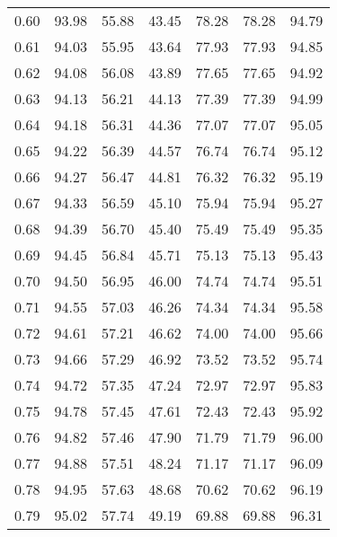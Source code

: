 \begin{tabular}{|c|c|c|c|c|c|c|}
      0.60 &     93.98 &     55.88 &      43.45 &   78.28 &      78.28 &         94.79 \\
      0.61 &     94.03 &     55.95 &      43.64 &   77.93 &      77.93 &         94.85 \\
      0.62 &     94.08 &     56.08 &      43.89 &   77.65 &      77.65 &         94.92 \\
      0.63 &     94.13 &     56.21 &      44.13 &   77.39 &      77.39 &         94.99 \\
      0.64 &     94.18 &     56.31 &      44.36 &   77.07 &      77.07 &         95.05 \\
      0.65 &     94.22 &     56.39 &      44.57 &   76.74 &      76.74 &         95.12 \\
      0.66 &     94.27 &     56.47 &      44.81 &   76.32 &      76.32 &         95.19 \\
      0.67 &     94.33 &     56.59 &      45.10 &   75.94 &      75.94 &         95.27 \\
      0.68 &     94.39 &     56.70 &      45.40 &   75.49 &      75.49 &         95.35 \\
      0.69 &     94.45 &     56.84 &      45.71 &   75.13 &      75.13 &         95.43 \\
      0.70 &     94.50 &     56.95 &      46.00 &   74.74 &      74.74 &         95.51 \\
      0.71 &     94.55 &     57.03 &      46.26 &   74.34 &      74.34 &         95.58 \\
      0.72 &     94.61 &     57.21 &      46.62 &   74.00 &      74.00 &         95.66 \\
      0.73 &     94.66 &     57.29 &      46.92 &   73.52 &      73.52 &         95.74 \\
      0.74 &     94.72 &     57.35 &      47.24 &   72.97 &      72.97 &         95.83 \\
      0.75 &     94.78 &     57.45 &      47.61 &   72.43 &      72.43 &         95.92 \\
      0.76 &     94.82 &     57.46 &      47.90 &   71.79 &      71.79 &         96.00 \\
      0.77 &     94.88 &     57.51 &      48.24 &   71.17 &      71.17 &         96.09 \\
      0.78 &     94.95 &     57.63 &      48.68 &   70.62 &      70.62 &         96.19 \\
      0.79 &     95.02 &     57.74 &      49.19 &   69.88 &      69.88 &         96.31 \\

\end{tabular}
